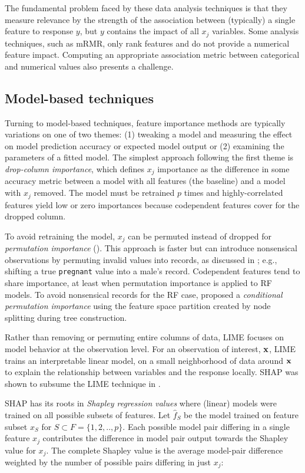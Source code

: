 \documentclass[11pt]{article}
\begin{document}
The fundamental problem faced by these data analysis techniques is that they measure relevance by the strength of the association between (typically) a single feature to response $y$, but $y$ contains the impact of all $x_j$ variables. Some analysis techniques, such as mRMR, only rank features and do not provide a numerical feature impact. Computing an appropriate association metric between categorical and numerical values also presents a challenge.

\subsection{Model-based techniques}

Turning to model-based techniques, feature importance methods are typically variations on one of two themes:  (1) tweaking a model and measuring the effect on model prediction accuracy or expected model output or (2) examining the parameters of a fitted model. The simplest approach following the first theme is {\em drop-column importance}, which defines $x_j$ importance as the difference in some accuracy metric between a model with all features (the baseline) and a model with $x_j$ removed. The model must be retrained $p$ times and highly-correlated features yield low or zero importances because codependent features cover for the dropped column.

To avoid retraining the model, $x_j$ can be permuted instead of dropped for {\em permutation importance} (\citealt{RF}). This approach is faster but can introduce nonsensical observations by permuting invalid values into records, as discussed in \cite{stopperm}; e.g., shifting a true {\tt\small pregnant} value into a male's record. Codependent features tend to share importance, at least when permutation importance is applied to RF models. To avoid nonsensical records for the RF case, \cite{rfimp} proposed a {\em conditional permutation importance} using the feature space partition created by node splitting during tree construction.  

Rather than removing or permuting entire columns of data, LIME \citep{lime} focuses on model behavior at the observation level. For an observation of interest, $\bf x$, LIME trains an interpretable linear model, on a small neighborhood of data around $\bf x$ to explain the relationship between variables and the response locally. SHAP was shown to subsume the LIME technique in \citep{shap}. 

SHAP has its roots in {\em Shapley regression values} \citep{shapley-regression} where (linear) models were trained on all possible subsets of features. Let $\hat{f}_S$ be the model trained on feature subset $x_S$ for $S \subset F = \{1, 2, .., p\}$. Each possible model pair differing in a single feature $x_j$ contributes the difference in model pair output towards the Shapley value for $x_j$. The complete Shapley value is the average model-pair difference weighted by the number of possible pairs differing in just $x_j$:
\vspace{-1mm}
\end{document}
